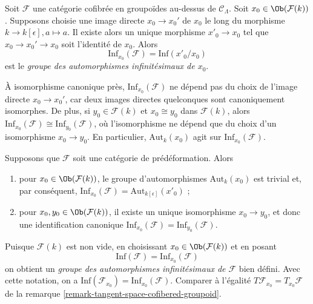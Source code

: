 \begin{definition}
\label{definition-infinitesimal-auts}
Soit $\mathcal{F}$ une catégorie cofibrée en groupoïdes au-dessus de $\mathcal
C_\Lambda$. Soit $x_0 \in \Ob(\mathcal{F}(k))$. Supposons choisie une image
directe $x_0 \to x_0'$ de $x_0$ le long du morphisme
$k \to k[\epsilon], a \mapsto a$. Il existe alors un unique morphisme
$x'_0 \to x_0$ tel que $x_0 \to x_0' \to x_0$ soit l'identité de $x_0$.
Alors
$$
\text{Inf}_{x_0}(\mathcal F) = \text{Inf}(x'_0/x_0)
$$
est le {\it groupe des automorphismes infinitésimaux de $x_0$}.
\end{definition}

\begin{remark}
\label{remark-choice-pushforward-immaterial-infinitesimal-aut}
À isomorphisme canonique près, $\text{Inf}_{x_0}(\mathcal{F})$ ne dépend pas
du choix de l'image directe $x_0 \to x_0'$, car deux images directes
quelconques sont canoniquement isomorphes. De plus, si
$y_0 \in \mathcal{F}(k)$ et $x_0 \cong y_0$ dans $\mathcal{F}(k)$, alors
$\text{Inf}_{x_0}(\mathcal{F}) \cong \text{Inf}_{y_0}(\mathcal{F})$,
où l'isomorphisme ne dépend que du choix d'un isomorphisme $x_0 \to y_0$. En
particulier, $\text{Aut}_k(x_0)$ agit sur $\text{Inf}_{x_0}(\mathcal{F})$.
\end{remark}

\begin{remark}
\label{remark-trivial-aut-point}
Supposons que $\mathcal{F}$ soit une catégorie de prédéformation. Alors
\begin{enumerate}
\item pour $x_0 \in \Ob(\mathcal{F}(k))$, le groupe d'automorphismes
$\text{Aut}_k(x_0)$ est trivial et, par conséquent,
$\text{Inf}_{x_0}(\mathcal{F}) = \text{Aut}_{k[\epsilon]}(x'_0)$ ;
\item pour $x_0, y_0 \in \Ob(\mathcal{F}(k))$, il existe un unique
isomorphisme $x_0 \to y_0$, et donc une identification canonique
$\text{Inf}_{x_0}(\mathcal{F}) = \text{Inf}_{y_0}(\mathcal{F})$.
\end{enumerate}
Puisque $\mathcal{F}(k)$ est non vide, en choisissant
$x_0 \in \Ob(\mathcal{F}(k))$ et en posant
$$
\text{Inf}(\mathcal{F}) = \text{Inf}_{x_0}(\mathcal{F})
$$
on obtient un {\it groupe des automorphismes infinitésimaux de $\mathcal{F}$}
bien défini. Avec cette notation, on a
$\text{Inf}(\mathcal{F}_{x_0}) = \text{Inf}_{x_0}(\mathcal{F})$.
Comparer à l'égalité
$T\mathcal{F}_{x_0} = T_{x_0}\mathcal{F}$
de la remarque \ref{remark-tangent-space-cofibered-groupoid}.
\end{remark}

